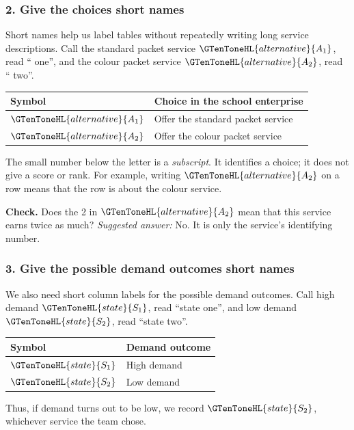 \subsubsection*{2. Give the choices short names}
Short names help us label tables without repeatedly writing long service descriptions. Call the standard packet service $\GTenToneHL{alternative}{A_1}$, read `` one'', and the colour packet service $\GTenToneHL{alternative}{A_2}$, read `` two''.
\begin{center}
\begin{tabular}{ll}
\toprule Symbol & Choice in the school enterprise \\ \midrule
$\GTenToneHL{alternative}{A_1}$ & Offer the standard packet service \\
$\GTenToneHL{alternative}{A_2}$ & Offer the colour packet service \\
\bottomrule
\end{tabular}
\end{center}
The small number below the letter is a \emph{subscript}. It identifies a choice; it does not give a score or rank. For example, writing $\GTenToneHL{alternative}{A_2}$ on a row means that the row is about the colour service.

\textbf{Check.} Does the 2 in $\GTenToneHL{alternative}{A_2}$ mean that this service earns twice as much? \emph{Suggested answer:} No. It is only the service's identifying number.

\subsubsection*{3. Give the possible demand outcomes short names}
We also need short column labels for the possible demand outcomes. Call high demand $\GTenToneHL{state}{S_1}$, read ``state one'', and low demand $\GTenToneHL{state}{S_2}$, read ``state two''.
\begin{center}
\begin{tabular}{ll}
\toprule Symbol & Demand outcome \\ \midrule
$\GTenToneHL{state}{S_1}$ & High demand \\
$\GTenToneHL{state}{S_2}$ & Low demand \\
\bottomrule
\end{tabular}
\end{center}
Thus, if demand turns out to be low, we record $\GTenToneHL{state}{S_2}$, whichever service the team chose.

